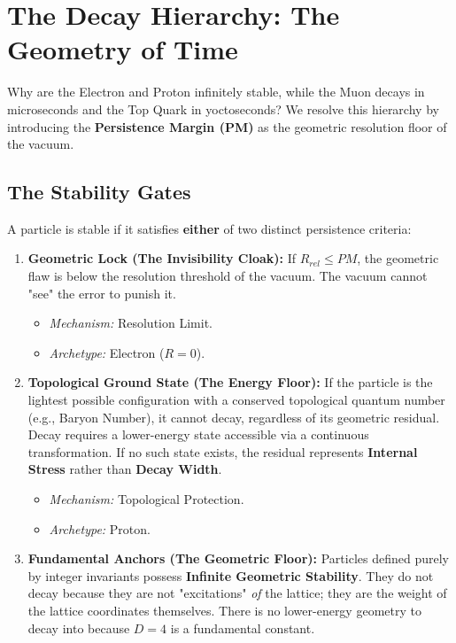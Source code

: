 \section*{The Decay Hierarchy: The Geometry of Time}

Why are the Electron and Proton infinitely stable, while the Muon decays in microseconds and the Top Quark in yoctoseconds? We resolve this hierarchy by introducing the \textbf{Persistence Margin (PM)} as the geometric resolution floor of the vacuum.

\subsection*{The Stability Gates}

A particle is stable if it satisfies \textbf{either} of two distinct persistence criteria:

\begin{enumerate}
    \item \textbf{Geometric Lock (The Invisibility Cloak):} If $R_{rel} \le PM$, the geometric flaw is below the resolution threshold of the vacuum. The vacuum cannot "see" the error to punish it.
    \begin{itemize}
        \item \textit{Mechanism:} Resolution Limit.
        \item \textit{Archetype:} Electron ($R=0$).
    \end{itemize}
    
    \item \textbf{Topological Ground State (The Energy Floor):} If the particle is the lightest possible configuration with a conserved topological quantum number (e.g., Baryon Number), it cannot decay, regardless of its geometric residual. Decay requires a lower-energy state accessible via a continuous transformation. If no such state exists, the residual represents \textbf{Internal Stress} rather than \textbf{Decay Width}.
    \begin{itemize}
        \item \textit{Mechanism:} Topological Protection.
        \item \textit{Archetype:} Proton.
    \end{itemize}
    
    \item \textbf{Fundamental Anchors (The Geometric Floor):} Particles defined purely by integer invariants possess \textbf{Infinite Geometric Stability}. They do not decay because they are not "excitations" \textit{of} the lattice; they are the weight of the lattice coordinates themselves. There is no lower-energy geometry to decay into because $D=4$ is a fundamental constant.
\end{enumerate}

